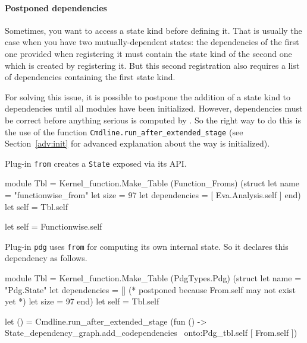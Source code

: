 
\paragraph{Postponed dependencies}

Sometimes, you want to access a state kind before defining it. That is
usually the case when you have two mutually-dependent states: the dependencies
of the first one provided when registering it must contain the state kind of
the second one which is created by registering it. But this second registration
also requires a list of dependencies containing the first state kind.

For solving this issue, it is possible to postpone the addition of a
state kind to dependencies until all modules have been initialized. However,
dependencies must be correct before anything serious is computed by \framac. So
the right way to do this is the use of the function
\texttt{Cmdline.run\_after\_extended\_stage}%
 (see
Section~\ref{adv:init} for advanced explanation about the way \framac is
initialized).
\begin{example}
Plug-in \texttt{from} creates a \texttt{State} exposed
via its API.

\noindent
{}
\begin{ocamlcode}
module Tbl =
  Kernel_function.Make_Table
    (Function_Froms)
    (struct
       let name = "functionwise_from"
       let size = 97
       let dependencies = [ Eva.Analysis.self ]
     end)
let self = Tbl.self
\end{ocamlcode}
\begin{ocamlcode}
let self = Functionwise.self
\end{ocamlcode}

Plug-in \texttt{pdg} uses
\texttt{from} for computing its own internal state. So it declares
this dependency as follows.

\noindent{}
\begin{ocamlcode}
module Tbl =
  Kernel_function.Make_Table
    (PdgTypes.Pdg)
    (struct
       let name = "Pdg.State"
       let dependencies = [] (* postponed because From.self may not exist yet *)
       let size = 97
    end)
let self = Tbl.self
\end{ocamlcode}
\begin{ocamlcode}
let () =
  Cmdline.run_after_extended_stage
    (fun () ->
       State_dependency_graph.add_codependencies
         ~onto:Pdg_tbl.self
         [ From.self ])
\end{ocamlcode}
\end{example}

